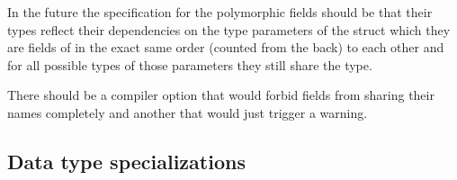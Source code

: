 In the future the specification for the polymorphic fields should be that their types reflect their dependencies on the type
parameters of the struct which they are fields of in the exact same order (counted from the back) to each other and for all possible types of those parameters they
still share the type.

There should be a compiler option that would forbid fields from sharing their names completely and another that would just trigger a warning.

\subsection{Data type specializations}

